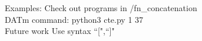 {Examples}: Check out programs in {\exs{}/fn\_concatenation}\\
DATm command: python3 cte.py 1  37\\
{Future work} Use syntax ``[",``]"
